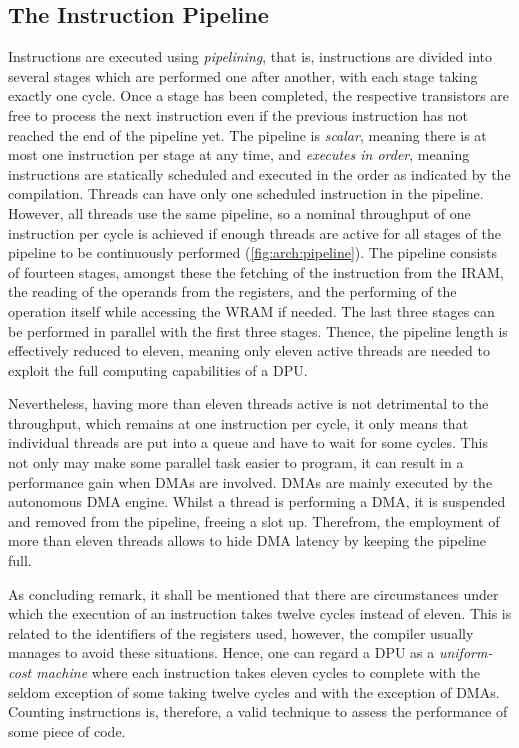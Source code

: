 \subsection{The Instruction Pipeline}
\label{sec:prereq:arch:pipeline}

Instructions are executed using \emph{pipelining}, that is, instructions are divided into several stages which are performed one after another, with each stage taking exactly one cycle.
Once a stage has been completed, the respective transistors are free to process the next instruction even if the previous instruction has not reached the end of the pipeline yet.
The pipeline is \emph{scalar}, meaning there is at most one instruction per stage at any time, and \emph{executes in order}, meaning instructions are statically scheduled and executed in the order as indicated by the compilation.
Threads can have only one scheduled instruction in the pipeline.
However, all threads use the same pipeline, so a nominal throughput of one instruction per cycle is achieved if enough threads are active for all stages of the pipeline to be continuously performed (\cref{fig:arch:pipeline}).
The pipeline consists of fourteen stages, amongst these the fetching of the instruction from the \ac{IRAM}, the reading of the operands from the registers, and the performing of the operation itself while accessing the \ac{WRAM} if needed.
The last three stages can be performed in parallel with the first three stages.
Thence, the pipeline length is effectively reduced to eleven, meaning only eleven active threads are needed to exploit the full computing capabilities of a DPU.

Nevertheless, having more than eleven threads active is not detrimental to the throughput, which remains at one instruction per cycle, it only means that individual threads are put into a queue and have to wait for some cycles.
This not only may make some parallel task easier to program, it can result in a performance gain when \acp{DMA} are involved.
\Acp{DMA} are mainly executed by the autonomous \ac{DMA} engine.
Whilst a thread is performing a \ac{DMA}, it is suspended and removed from the pipeline, freeing a slot up.
Therefrom, the employment of more than eleven threads allows to hide \ac{DMA} latency by keeping the pipeline full.

As concluding remark, it shall be mentioned that there are circumstances under which the execution of an instruction takes twelve cycles instead of eleven.
This is related to the identifiers of the registers used, however, the compiler usually manages to avoid these situations.
Hence, one can regard a \ac{DPU} as a \emph{uniform-cost machine} where each instruction takes eleven cycles to complete with the seldom exception of some taking twelve cycles and with the exception of \acp{DMA}.
Counting instructions is, therefore, a valid technique to assess the performance of some piece of code.

